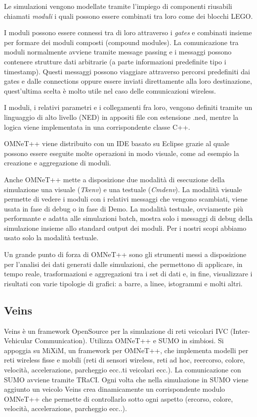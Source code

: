 Le simulazioni vengono modellate tramite l'impiego di componenti riusabili chiamati \emph{moduli} i quali possono essere combinati tra loro come dei blocchi LEGO.

I moduli possono essere connessi tra di loro attraverso i \emph{gates} e combinati insieme per formare dei moduli composti (compound modules). La comunicazione tra moduli normalmente avviene tramite message passing e i messaggi possono contenere strutture dati arbitrarie (a parte informazioni predefinite tipo i timestamp). Questi messaggi possono viaggiare attraverso percorsi predefiniti dai gates e dalle connections oppure essere inviati direttamente alla loro destinazione, quest'ultima scelta è molto utile nel caso delle comunicazioni wireless. 

I moduli, i relativi parametri e i collegamenti fra loro, vengono definiti tramite un linguaggio di alto livello (NED) in appositi file con estensione .ned, mentre la logica viene implementata in una corrispondente classe C++.

OMNeT++ viene distribuito con un IDE basato su Eclipse grazie al quale possono essere eseguite molte operazioni in modo visuale, come ad esempio la creazione e aggregazione di moduli.

Anche OMNeT++ mette a disposizione due modalità di esecuzione della simulazione una visuale (\emph{Tkenv}) e una testuale (\emph{Cmdenv}). La modalità visuale permette di vedere i moduli con i relativi messaggi che vengono scambiati, viene usata in fase di debug o in fase di Demo. La modalità testuale, ovviamente più performante e adatta alle simulazioni batch, mostra solo i messaggi di debug della simulazione insieme allo standard output dei moduli. Per i nostri scopi abbiamo usato solo la modalità testuale.

Un grande punto di forza di OMNeT++ sono gli strumenti messi a disposizione per l'analisi dei dati generati dalle simulazioni, che permettono di applicare, in tempo reale, trasformazioni e aggregazioni tra i set di dati e, in fine, visualizzare i risultati con varie tipologie di grafici: a barre, a linee, istogrammi e molti altri.

\subsection{Veins}\label{veins}
Veins è un framework OpenSource per la simulazione di reti veicolari IVC (Inter-Vehicular Communication). Utilizza OMNeT++ e SUMO in simbiosi. Si appoggia su MiXiM, un framework per OMNeT++, che implementa modelli per reti wireless fisse e mobili (reti di sensori wireless, reti ad hoc, reercorso, colore, velocità, accelerazione, parcheggio ecc..ti veicolari ecc.). La comunicazione con SUMO avviene tramite TRaCI. Ogni volta che nella simulazione in SUMO viene aggiunto un veicolo Veins crea dinamicamente un corrispondente modulo OMNeT++ che permette di controllarlo sotto ogni aspetto (ercorso, colore, velocità, accelerazione, parcheggio ecc..).

